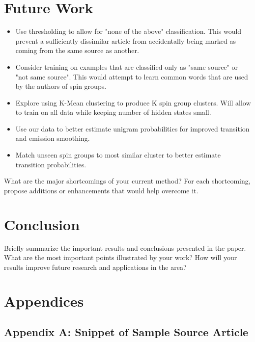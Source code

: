 \documentclass[11pt,letterpaper,oneside, titlepage]{scrartcl}
\begin{document}
\section{Future Work}
\begin{itemize}

\item Use thresholding to allow for "none of the above" classification.  This would prevent a sufficiently dissimilar article from accidentally being marked as coming from the same source as another.

\item Consider training on examples that are classified only as "same source" or "not same source".  This would attempt to learn common words that are used by the authors of spin groups.

\item Explore using K-Mean clustering to produce K spin group clusters. Will allow to train on all data while keeping number of hidden states small.

\item Use our data to better estimate unigram probabilities for improved transition and emission smoothing.

\item Match unseen spin groups to most similar cluster to better estimate transition probabilities.

\end{itemize}
What are the major shortcomings of your current method? For each shortcoming, propose additions or enhancements that would help overcome it.


\section{Conclusion}

Briefly summarize the important results and conclusions presented in the paper. What are the most important points illustrated by your work? How will your results improve future research and applications in the area?

\section{Appendices}

\subsection{Appendix A: Snippet of Sample Source Article}
\end{document}
